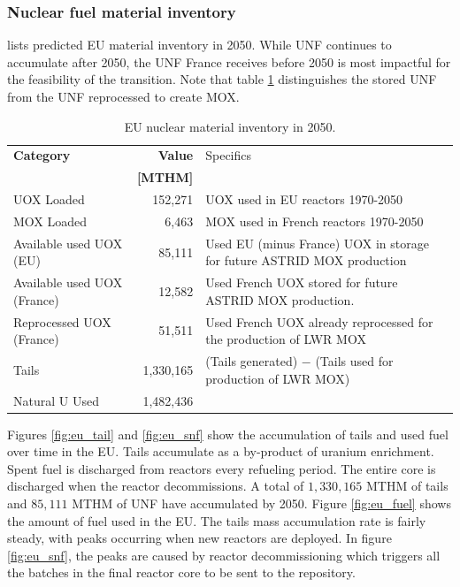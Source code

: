 \subsubsection{Nuclear fuel material inventory}
lists predicted \gls{EU} material inventory in 2050.
While \gls{UNF} continues to accumulate after 2050, the
\gls{UNF} France receives before 2050 is most impactful for the
feasibility of the transition. Note that table \ref{tab:sim_result1} 
distinguishes the
stored \gls{UNF} from the \gls{UNF} reprocessed to create \gls{MOX}.


\begin{table}[h]
    \centering
        \caption{\gls{EU} nuclear material inventory in 2050.}
\begin{tabularx}{\textwidth}{XrX}
            \hline
                        \textbf{Category} & \textbf{Value} & Specifics \\
                                          & \textbf{[MTHM]} & \\ \hline
                        UOX Loaded  & 152,271 & UOX used in EU reactors 1970-2050\\ 
            MOX Loaded  & 6,463  & MOX used in French reactors 1970-2050\\
                        Available used UOX (EU)  & 85,111  & Used EU (minus France) 
                                UOX in storage for future ASTRID MOX 
                                production\\
                        Available used UOX (France) & 
                                12,582  & Used French UOX stored for 
                                future ASTRID MOX production. \\
                                Reprocessed UOX (France) & 51,511 & Used French UOX already reprocessed for the production of LWR MOX \\
            Tails  & 1,330,165  & (Tails generated) $-$ (Tails used for production of LWR MOX) \\ 
            Natural U Used  & 1,482,436  & \\ \hline
        \end{tabularx}
        
        \label{tab:sim_result1}
\end {table}
\FloatBarrier



Figures \ref{fig:eu_tail} and \ref{fig:eu_snf} show the 
accumulation of tails and used fuel over time in the \gls{EU}.
Tails accumulate as a by-product of uranium enrichment. 
Spent fuel is discharged from reactors every refueling period.
The entire core is discharged when the reactor decommissions.
A total of $1,330,165$ MTHM of tails and $85,111$ MTHM of
\gls{UNF} have accumulated by 2050.
Figure \ref{fig:eu_fuel} shows the amount of fuel used in the \gls{EU}. The 
tails mass accumulation rate is fairly steady, with peaks occurring when new 
reactors are deployed.
In figure \ref{fig:eu_snf}, the peaks are caused by reactor decommissioning which 
triggers all the batches in the final reactor core to be sent to the repository.


